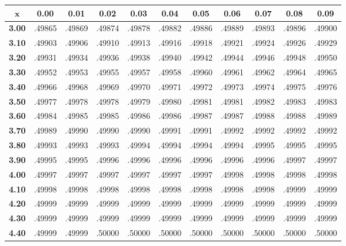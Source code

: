 \noindent \begin{tabular}{|c|c|c|c|c|c|c|c|c|c|c|}
\hline
$\pmb{x}$ & \textbf{ 0.00 } & \textbf{ 0.01 } & \textbf{ 0.02 } & \textbf{ 0.03 } & \textbf{ 0.04 } & \textbf{ 0.05 } & \textbf{ 0.06 } & \textbf{ 0.07 } & \textbf{ 0.08 } & \textbf{ 0.09 } \\ 
 \hline 
\textbf{ 3.00 } & .49865 & .49869 & .49874 & .49878 & .49882 & .49886 & .49889 & .49893 & .49896 & .49900\\ 
\hline
\textbf{ 3.10 } & .49903 & .49906 & .49910 & .49913 & .49916 & .49918 & .49921 & .49924 & .49926 & .49929\\ 
\hline
\textbf{ 3.20 } & .49931 & .49934 & .49936 & .49938 & .49940 & .49942 & .49944 & .49946 & .49948 & .49950\\ 
\hline
\textbf{ 3.30 } & .49952 & .49953 & .49955 & .49957 & .49958 & .49960 & .49961 & .49962 & .49964 & .49965\\ 
\hline
\textbf{ 3.40 } & .49966 & .49968 & .49969 & .49970 & .49971 & .49972 & .49973 & .49974 & .49975 & .49976\\ 
\hline
\textbf{ 3.50 } & .49977 & .49978 & .49978 & .49979 & .49980 & .49981 & .49981 & .49982 & .49983 & .49983\\ 
\hline
\textbf{ 3.60 } & .49984 & .49985 & .49985 & .49986 & .49986 & .49987 & .49987 & .49988 & .49988 & .49989\\ 
\hline
\textbf{ 3.70 } & .49989 & .49990 & .49990 & .49990 & .49991 & .49991 & .49992 & .49992 & .49992 & .49992\\ 
\hline
\textbf{ 3.80 } & .49993 & .49993 & .49993 & .49994 & .49994 & .49994 & .49994 & .49995 & .49995 & .49995\\ 
\hline
\textbf{ 3.90 } & .49995 & .49995 & .49996 & .49996 & .49996 & .49996 & .49996 & .49996 & .49997 & .49997\\ 
\hline
\textbf{ 4.00 } & .49997 & .49997 & .49997 & .49997 & .49997 & .49997 & .49998 & .49998 & .49998 & .49998\\ 
\hline
\textbf{ 4.10 } & .49998 & .49998 & .49998 & .49998 & .49998 & .49998 & .49998 & .49998 & .49999 & .49999\\ 
\hline
\textbf{ 4.20 } & .49999 & .49999 & .49999 & .49999 & .49999 & .49999 & .49999 & .49999 & .49999 & .49999\\ 
\hline
\textbf{ 4.30 } & .49999 & .49999 & .49999 & .49999 & .49999 & .49999 & .49999 & .49999 & .49999 & .49999\\ 
\hline
\textbf{ 4.40 } & .49999 & .49999 & .50000 & .50000 & .50000 & .50000 & .50000 & .50000 & .50000 & .50000\\ 

\end{tabular}
